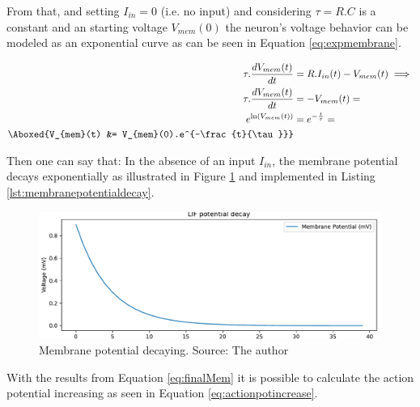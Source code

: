 				\par From that, and setting $I_{in} = 0$ (i.e. no input) and considering $\tau = R.C$ is a constant and an starting voltage $V_{mem}(0)$ the neuron's voltage behavior can be modeled as an exponential curve as can be seen in Equation \ref{eq:expmembrane}.
			
			 	\begin{equation}
			 		\label{eq:expmembrane}
			 		\begin{aligned}
			 		\tau.\dfrac{dV_{mem}(t)}{dt} &= R.I_{in}(t) - V_{mem}(t) \implies \\
			 		\tau.\dfrac{dV_{mem}(t)}{dt} &= -V_{mem}(t) = \\
			 		e^{\ln(V_{mem}(t))} &= e^{-\frac{t}{\tau}} = \\
			 		\Aboxed{V_{mem}(t) &= V_{mem}(0).e^{-\frac{t}{\tau}}}
			 		\end{aligned}
			 	\end{equation}
	 	
	 		\par Then one can say that: In the absence of an input $I_{in}$, the membrane potential decays exponentially as illustrated in Figure \ref{fig:membranepotentialdecay} and implemented in Listing \ref{lst:membranepotentialdecay}.
	 		
	 			

		 		\begin{figure}[H]
		 			\centering
		 			\includegraphics[width=\linewidth]{images/membranePotentialDecay}
		 			\caption{Membrane potential decaying. Source: The author}
		 			\label{fig:membranepotentialdecay}
		 		\end{figure}
 			
 			\par With the results from Equation \ref{eq:finalMem} it is possible to calculate the action potential increasing as seen in Equation \ref{eq:actionpotincrease}.
 			
